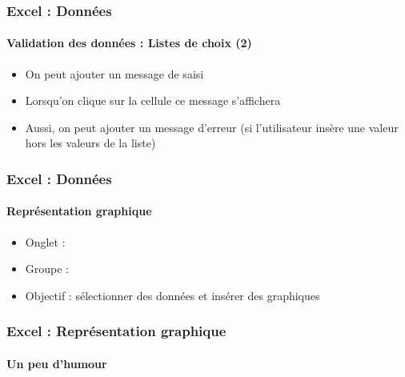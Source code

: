 \documentclass[xcolor=table, usenames,dvipsnames]{beamer}
\begin{document}
\begin{frame}
\frametitle{Excel : Données}
\framesubtitle{Validation des données : Listes de choix (2)}

\begin{minipage}{0.60\textwidth}
	\begin{itemize}
		\item On peut ajouter un message de saisi
		\item Lorsqu'on clique sur la cellule ce message s'affichera 
		\item Aussi, on peut ajouter un message d'erreur (si l'utilisateur insère une valeur hors les valeurs de la liste) 
	\end{itemize}
\end{minipage}
%
\begin{minipage}{0.39\textwidth}
	
\end{minipage}

\end{frame}

\begin{frame}
\frametitle{Excel : Données}
\framesubtitle{Représentation graphique}

\begin{minipage}{0.5\textwidth}
	\begin{itemize}
		\item Onglet : 
		\item Groupe : 
		\item Objectif : sélectionner des données et insérer des graphiques
	\end{itemize}
\end{minipage}
%
\begin{minipage}{0.49\textwidth}
	
\end{minipage}

\end{frame}

\begin{frame}
\frametitle{Excel : Représentation graphique}
\framesubtitle{Un peu d'humour}

\begin{center}
\end{center}

\end{frame}
\end{document}
